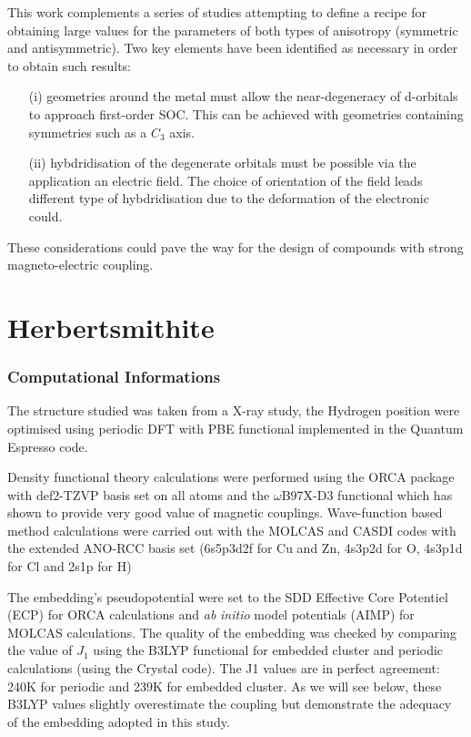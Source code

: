 \documentclass[12pt]{report}
\numberwithin{equation}{section}
\begin{document}
\par This work complements a series of studies attempting to define a recipe for obtaining large values for the parameters of both types of anisotropy (symmetric and antisymmetric).
Two key elements have been identified as necessary in order to obtain such results:
\begin{itemize}
    \item[(i)] geometries around the metal must allow the near-degeneracy of d-orbitals to approach first-order SOC. This can be achieved with geometries containing symmetries such as a $C_3$ axis.
    \item[(ii)] hybdridisation of the degenerate orbitals must be possible via the application an electric field. The choice of orientation of the field leads different type of hybdridisation due to the deformation of the electronic could. 
\end{itemize}
These considerations could pave the way for the design of compounds with strong magneto-electric coupling.


\chapter{Herbertsmithite}


\subsection*{Computational Informations}

The structure studied was taken from a X-ray study, the Hydrogen position were optimised using periodic DFT with PBE functional implemented in the Quantum Espresso code.

Density functional theory calculations were performed using the ORCA package with def2-TZVP basis set on all atoms and the $\omega$B97X-D3 functional which has shown to provide very good value of magnetic couplings.
Wave-function based method calculations were carried out with the MOLCAS and CASDI codes with the extended ANO-RCC basis set (6s5p3d2f for Cu and Zn, 4s3p2d
for O, 4s3p1d for Cl and 2s1p for H)

The embedding's pseudopotential were set to the SDD Effective Core Potentiel (ECP) for ORCA calculations and \textit{ab} \textit{initio} model potentials (AIMP) for MOLCAS calculations. 
The quality of the embedding was checked by comparing the value of $J_1$ using the B3LYP functional for embedded cluster and periodic calculations (using the Crystal code). 
The J1 values are in perfect agreement: 240K for periodic and 239K for embedded cluster. 
As we will see below, these B3LYP values slightly overestimate the coupling but demonstrate the adequacy of the embedding adopted in this study.
\end{document}
